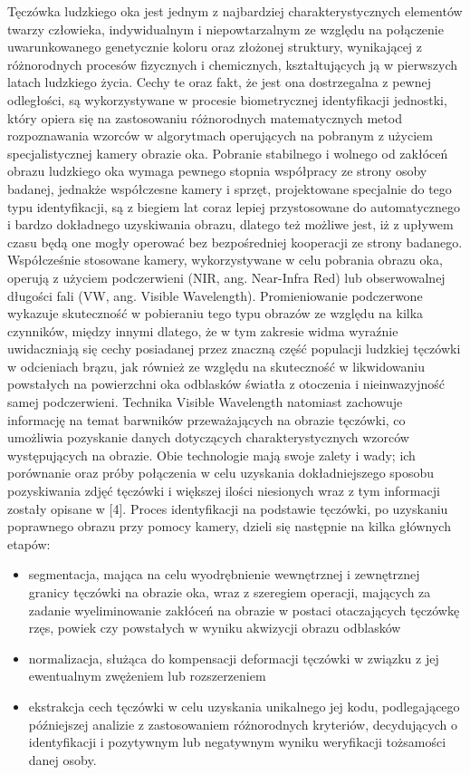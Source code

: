 Tęczówka ludzkiego oka jest jednym z najbardziej charakterystycznych elementów twarzy człowieka, indywidualnym i niepowtarzalnym ze względu na połączenie uwarunkowanego genetycznie koloru oraz złożonej struktury, wynikającej z różnorodnych procesów fizycznych i chemicznych, kształtujących ją w pierwszych latach ludzkiego życia. Cechy te oraz fakt, że jest ona  dostrzegalna z pewnej odległości, są wykorzystywane w procesie biometrycznej identyfikacji jednostki, który opiera się na zastosowaniu różnorodnych matematycznych metod rozpoznawania wzorców w algorytmach operujących na pobranym z użyciem specjalistycznej kamery obrazie oka.
	Pobranie stabilnego i wolnego od zakłóceń obrazu ludzkiego oka wymaga pewnego stopnia współpracy ze strony osoby badanej, jednakże współczesne kamery i sprzęt, projektowane specjalnie do tego typu identyfikacji, są z biegiem lat coraz lepiej przystosowane do automatycznego i bardzo dokładnego uzyskiwania obrazu, dlatego też możliwe jest, iż z upływem czasu będą one mogły operować bez bezpośredniej kooperacji ze strony badanego.
	Współcześnie stosowane kamery, wykorzystywane w celu pobrania obrazu oka, operują z użyciem podczerwieni (NIR, ang. Near-Infra Red) lub obserwowalnej długości fali (VW, ang. Visible Wavelength). Promieniowanie podczerwone wykazuje skuteczność w pobieraniu tego typu obrazów ze względu na kilka czynników, między innymi dlatego, że w tym zakresie widma wyraźnie uwidaczniają się cechy posiadanej przez znaczną część populacji ludzkiej tęczówki w  odcieniach brązu, jak również ze względu na skuteczność w likwidowaniu powstałych na powierzchni oka odblasków światła z otoczenia i nieinwazyjność samej podczerwieni. Technika Visible Wavelength natomiast zachowuje informację na temat barwników przeważających na obrazie tęczówki, co umożliwia pozyskanie danych dotyczących charakterystycznych wzorców występujących na obrazie. Obie technologie mają swoje zalety i wady; ich porównanie oraz próby połączenia w celu uzyskania dokładniejszego sposobu pozyskiwania zdjęć tęczówki i większej ilości niesionych wraz z tym informacji zostały opisane w [4]. 
	Proces identyfikacji na podstawie tęczówki, po uzyskaniu poprawnego obrazu przy pomocy kamery, dzieli się następnie na kilka głównych etapów: \begin{itemize}
\item segmentacja, mająca na celu wyodrębnienie wewnętrznej i zewnętrznej granicy tęczówki na obrazie oka, wraz z szeregiem operacji, mających za zadanie wyeliminowanie zakłóceń na obrazie w postaci otaczających tęczówkę rzęs, powiek czy powstałych w wyniku akwizycji obrazu odblasków
\item normalizacja, służąca do kompensacji deformacji tęczówki w związku z jej ewentualnym zwężeniem lub rozszerzeniem 
\item ekstrakcja cech tęczówki w celu uzyskania unikalnego jej kodu, podlegającego późniejszej analizie z zastosowaniem różnorodnych kryteriów, decydujących o identyfikacji i pozytywnym lub negatywnym wyniku weryfikacji tożsamości danej osoby.
\end{itemize}
